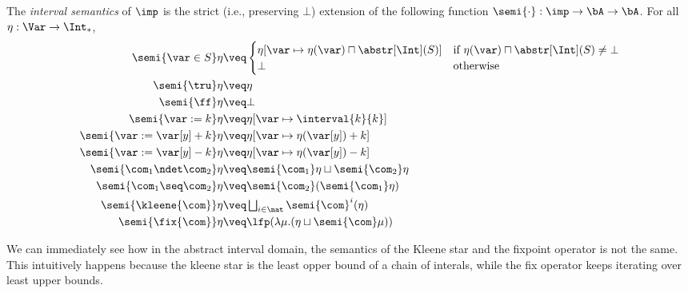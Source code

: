 \begin{definition}\label{de:intervalsem}
  The \emph{interval semantics} of \(\imp\) is the strict (i.e.,
  preserving \(\bot\))
  extension of the following function \(\semi{\cdot}: \imp \to
  \bA \to \bA\). For all \(\eta: \Var \to \Int_*\),
  \begin{align*}
    \semi{\var \in S}\eta 
    & \veq  
      \begin{cases}
        \eta[\var \mapsto \eta(\var)\sqcap \abstr[\Int](S)] & \text{if
                                                              }\eta(\var)\sqcap \abstr[\Int](S)\neq \bot \\ \bot &
                                                                                                                   \text{otherwise}
      \end{cases}\\
    \semi{\tru}\eta 
    & \veq \eta\\
    \semi{\ff}\eta 
    & \veq \bot\\
    \semi{\var := k}\eta 
    & \veq \eta[\var \mapsto \interval{k}{k}]\\
    \semi{\var := \var[y] + k}\eta 
    & \veq \eta[\var \mapsto \eta (\var[y]) + k]\\
    \semi{\var := \var[y] - k}\eta 
    & \veq \eta[\var \mapsto \eta (\var[y]) - k]\\
    \semi{\com_1 \ndet \com_2} \eta
    & \veq \semi{\com_1} \eta \sqcup \semi{\com_2} \eta\\
    \semi{\com_1 \seq \com_2} \eta
    & \veq \semi{\com_2} (\semi{\com_1} \eta)\\
    \semi{\kleene{\com}} \eta
    & \veq \textstyle \bigsqcup_{i \in \nat} \semi{\com}^i (\eta)\\
    \semi{\fix{\com}} \eta
    & \veq  \lfp(\lambda \mu. (\eta \sqcup \semi{\com} \mu))
  \end{align*}
\end{definition}

We can immediately see how in the abstract interval domain, the
semantics of the Kleene star and the fixpoint operator is not the
same. This intuitively happens because the kleene star is the least
opper bound of a chain of interals, while the fix operator keeps
iterating over least upper bounds.

